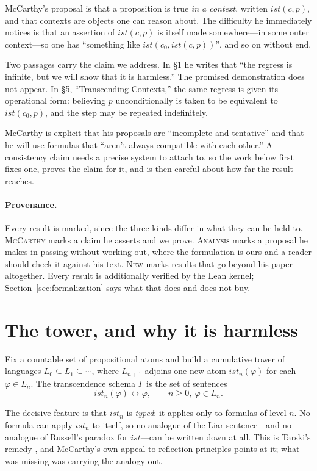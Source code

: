 \documentclass[11pt]{article}
\theoremstyle{plain}
\theoremstyle{remark}
\newcommand{\prov}[1]{\textnormal{\footnotesize\textsc{#1}}}
\newcommand{\ist}{\mathit{ist}}
\begin{document}
McCarthy's proposal is that a proposition is true \emph{in a context}, written
$\ist(c,p)$, and that contexts are objects one can reason about. The difficulty
he immediately notices is that an assertion of $\ist(c,p)$ is itself made
somewhere---in some outer context---so one has ``something like
$\ist(c_0, \ist(c,p))$'', and so on without end.

Two passages carry the claim we address. In \S1 he writes that ``the regress is
infinite, but we will show that it is harmless.'' The promised demonstration
does not appear. In \S5, ``Transcending Contexts,'' the same regress is given
its operational form: believing $p$ unconditionally is taken to be equivalent to
$\ist(c_0,p)$, and the step may be repeated indefinitely.

McCarthy is explicit that his proposals are ``incomplete and tentative'' and
that he will use formulas that ``aren't always compatible with each other.'' A
consistency claim needs a precise system to attach to, so the work below first
fixes one, proves the claim for it, and is then careful about how far the result
reaches.

\paragraph{Provenance.}
Every result is marked, since the three kinds differ in what they can be held
to. \prov{McCarthy} marks a claim he asserts and we prove. \prov{Analysis} marks
a proposal he makes in passing without working out, where the formulation is
ours and a reader should check it against his text. \prov{New} marks results
that go beyond his paper altogether. Every result is additionally verified by
the Lean kernel; Section~\ref{sec:formalization} says what that does and does
not buy.

\section{The tower, and why it is harmless}

Fix a countable set of propositional atoms and build a cumulative tower of
languages $L_0 \subseteq L_1 \subseteq \cdots$, where $L_{n+1}$ adjoins one new
atom $\ist_n(\varphi)$ for each $\varphi \in L_n$. The transcendence schema
$\Gamma$ is the set of sentences
\[
  \ist_n(\varphi) \leftrightarrow \varphi,
  \qquad n \ge 0,\ \varphi \in L_n .
\]

The decisive feature is that $\ist_n$ is \emph{typed}: it applies only to
formulas of level $n$. No formula can apply $\ist_n$ to itself, so no analogue
of the Liar sentence---and no analogue of Russell's paradox for
$\ist$---can be written down at all. This is Tarski's remedy \cite{tarski}, and
McCarthy's own appeal to reflection principles points at it; what was missing
was carrying the analogy out.
\end{document}

